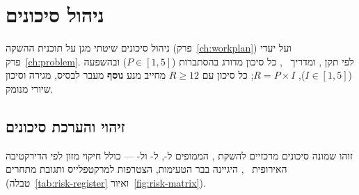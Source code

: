 \chapter{ניהול סיכונים}
\label{ch:risks}

ניהול סיכונים שיטתי מגן על תוכנית ההשקה (פרק~\ref{ch:workplan}) ועל יעדי
פרק~\ref{ch:problem}. לפי תקן ,  ומדריך
~\cite{iso2018risk,iec2019risk,pmi2021pmbok}, כל סיכון מדורג בהסתברות
($P \in [1, 5]$) ובהשפעה ($I \in [1, 5]$), $R = P \times I$; כל סיכון עם
$R \geq 12$ מחייב מנע \textbf{נוסף} מעבר לבסיס, מגירה וסיכון שיורי מנומק.

\section{זיהוי והערכת סיכונים}
\label{sec:risks-assessment}

זוהו שמונה סיכונים מרכזיים להשקת , הממופים ל-\mbox{},
ל- ול- --- כולל חיקוי מזון לפי הדירקטיבה
האירופית ~\cite{eurlex1987foodimitation}, היגיינה בבר הטעימות,
הצטרפות למרקטפלייס ותגובת מתחרים (טבלה~\ref{tab:risk-register}
ואיור~\ref{fig:risk-matrix}).

